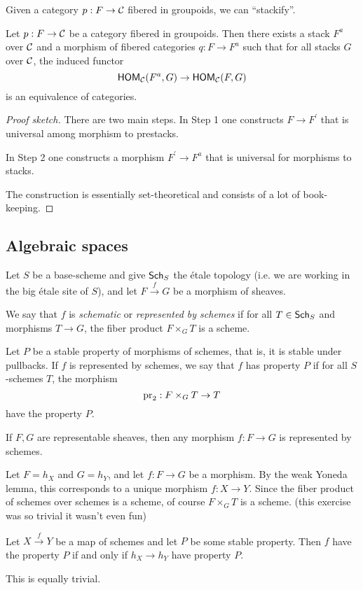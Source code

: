 \documentclass[11pt, english]{article}
\begin{document}
Given a category $p:F \to \mathcal{C}$ fibered in groupoids, we can ``stackify''.

\begin{thm}[Stackification]
Let $p:F \to \mathcal{C}$ be a category fibered in groupoids. Then there exists a stack $F^a$ over $\mathcal{C}$ and a morphism of fibered categories $q:F \to F^a$ such that for all stacks $G$ over $\mathcal{C}$, the induced functor
\[
\operatorname{\mathsf{HOM}}_{\mathcal{C}}(F^a, G) \to \operatorname{\mathsf{HOM}}_{\mathcal{C}}(F,G)
\]
is an equivalence of categories.
\end{thm}
\begin{proof}[Proof sketch]

There are two main steps. In Step 1 one constructs $F \to F^\prime$ that is universal among morphism to prestacks.

In Step 2 one constructs a morphism $F^\prime \to F^a$ that is universal for morphisms to stacks. 

The construction is essentially set-theoretical and consists of a lot of book-keeping.
\end{proof}

\subsection{Algebraic spaces}

Let $S$ be a base-scheme and give $\mathsf{Sch}_{S}$ the étale topology (i.e. we are working in the big étale site of $S$), and let $F \xrightarrow{f} G$ be a morphism of sheaves.

\begin{defi}
We say that $f$ is \emph{schematic} or \emph{represented by schemes} if for all $T \in \mathsf{Sch}_{S}$ and morphisms $T \to G$, the fiber product $F \times_G T$ is a scheme.
\end{defi}

\begin{defi}
Let $P$ be a stable property of morphisms of schemes, that is, it is stable under pullbacks. If $f$ is represented by schemes, we say that $f$ has property $P$ if for all $S$-schemes $T$, the morphism
\[
\mathrm{pr}_2: F \times_G T \to T
\]
have the property $P$.
\end{defi}

\begin{exc}
If $F,G$ are representable sheaves, then any morphism $f:F \to G$ is represented by schemes.
\end{exc}
\begin{sol}
Let $F=h_X$ and $G=h_Y$, and let $f:F \to G$ be a morphism. By the weak Yoneda lemma, this corresponds to a unique morphism $f:X \to Y$. Since the fiber product of schemes over schemes is a scheme, of course $F \times_G T$ is a scheme. (this exercise was so trivial it wasn't even fun)
\end{sol}
\begin{exc}Let $X \xrightarrow{f} Y$ be a map of schemes and let $P$ be some stable property. Then $f$ have the property $P$ if and only if $h_X \to h_Y$ have property $P$.
\end{exc}
\begin{sol}
This is equally trivial.
\end{sol}
\end{document}
